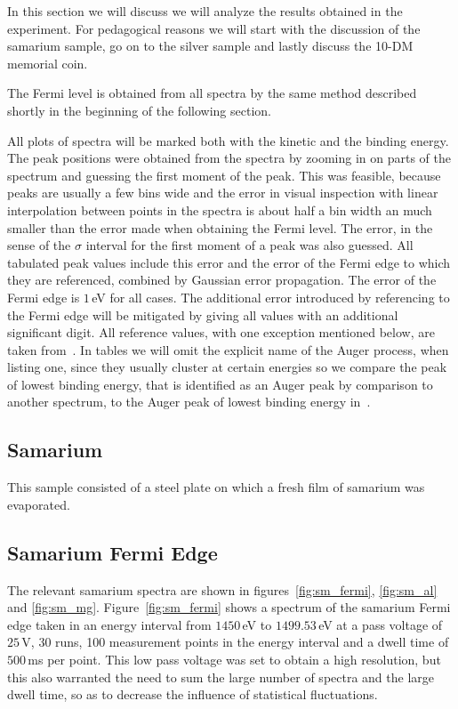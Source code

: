 \documentclass[a4paper,10pt]{scrartcl}
\begin{document}
In this section we will discuss we will analyze the results obtained in the experiment. For pedagogical reasons we will start with the discussion of the samarium sample, go on to the silver sample and lastly discuss the 10-DM memorial coin.

The Fermi level is obtained from all spectra by the same method described shortly in the beginning of the following section. 

All plots of spectra will be marked both with the kinetic and the binding energy. The peak positions were obtained from the spectra by zooming in on parts of the spectrum and guessing the first moment of the peak. This was feasible, because peaks are usually a few bins wide and the error in visual inspection with linear interpolation between points in the spectra is about half a bin width an much smaller than the error made when obtaining the Fermi level. The error, in the sense of the $\sigma$ interval for the first moment of a peak was also guessed. All tabulated peak values include this error and the error of the Fermi edge to which they are referenced, combined by Gaussian error propagation. The error of the Fermi edge is $1\,$eV for all cases. The additional error introduced by referencing to the Fermi edge will be mitigated by giving all values with an additional significant digit. All reference values, with one exception mentioned below, are taken from~\cite{handbook}. In tables we will omit the  explicit name of the Auger process, when listing one, since they usually cluster at certain energies  so we compare the peak of lowest binding energy, that is identified as an Auger peak by comparison to another spectrum, to the Auger peak of lowest binding energy in~\cite{handbook}.

\subsection{Samarium}

This sample consisted of a steel plate on which a fresh film of samarium was evaporated.

\subsection*{Samarium Fermi Edge}

The relevant samarium spectra are shown in figures~\ref{fig:sm_fermi}, \ref{fig:sm_al} and \ref{fig:sm_mg}. Figure~\ref{fig:sm_fermi} shows a spectrum of the samarium Fermi edge taken in an energy interval from $1450\,$eV to $1499.53\,$eV at a pass voltage of $25\,$V, 30 runs, 100 measurement points in the energy interval and a dwell time of $500\,$ms per point. This low pass voltage was set to obtain a high resolution, but this also warranted the need to sum the large number of spectra and the large dwell time, so as to decrease the influence of statistical fluctuations.
\end{document}
